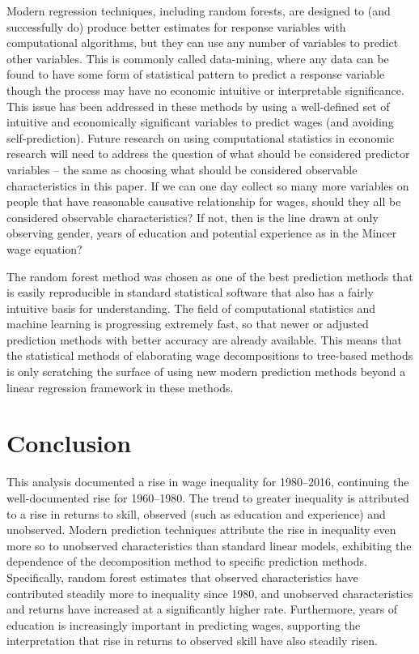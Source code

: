 \documentclass[notitlepage,12pt]{article}
\newcommand{\1}[1]{\ensuremath{\mathbb{1}\left( #1 \right)}}               %
\begin{document}
Modern regression techniques, including random forests, are designed to (and successfully do) produce better estimates for response variables with computational algorithms, but they can use any number of variables to predict other variables.  This is commonly called data-mining, where any data can be found to have some form of statistical pattern to predict a response variable though the process may have no economic intuitive or interpretable significance.  This issue has been addressed in these methods by using a well-defined set of intuitive and economically significant variables to predict wages (and avoiding self-prediction).  Future research on using computational statistics in economic research will need to address the question of what should be considered predictor variables -- the same as choosing what should be considered observable characteristics in this paper.  If we can one day collect so many more variables on people that have reasonable causative relationship for wages, should they all be considered observable characteristics?  If not, then is the line drawn at only observing gender, years of education and potential experience as in the Mincer wage equation?

The random forest method was chosen as one of the best prediction methods that is easily reproducible in standard statistical software that also has a fairly intuitive basis for understanding.  The field of computational statistics and machine learning is progressing extremely fast, so that newer or adjusted prediction methods with better accuracy are already available.  This means that the statistical methods of elaborating wage decompositions to tree-based methods is only scratching the surface of using new modern prediction methods beyond a linear regression framework in these methods.

\section{Conclusion}
\label{conclusion}
This analysis documented a rise in wage inequality for 1980--2016, continuing the well-documented rise for 1960--1980.  The trend to greater inequality is attributed to a rise in returns to skill, observed (such as education and experience) and unobserved.  Modern prediction techniques attribute the rise in inequality even more so to unobserved characteristics than standard linear models, exhibiting the dependence of the \cite{juhn1993wage} decomposition method to specific prediction methods.  Specifically, random forest estimates that observed characteristics have contributed steadily more to inequality since 1980, and unobserved characteristics and returns have increased at a significantly higher rate.  Furthermore, years of education is increasingly important in predicting wages, supporting the interpretation that rise in returns to observed skill have also steadily risen.
\end{document}
